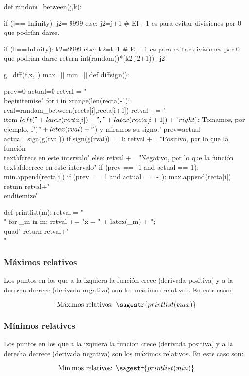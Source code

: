 \begin{sagesilent}

def random_between(j,k):
    
    if (j==-Infinity):
        j2=-9999
    else:
        j2=j+1 # El +1 es para evitar divisiones por 0 que podrían darse.
        
    if (k==Infinity):
        k2=9999
    else:        
        k2=k-1 # El +1 es para evitar divisiones por 0 que podrían darse
    return int(random()*(k2-j2+1))+j2

g=diff(f,x,1)
max=[]
min=[]
def diffsign():

    prev=0
    actual=0
    retval = "\\begin{itemize}"
    for i in xrange(len(recta)-1):
        rval=random_between(recta[i],recta[i+1])
        retval += "\\item $\\left("+latex(recta[i])+","+latex(recta[i+1])+"\\right)$: Tomamos, por ejemplo, f'($"+latex(rval)+"$) y miramos su signo:" 
        prev=actual
        actual=sign(g(rval))
        if sign(g(rval))==1: 
            retval += "Positivo, por lo que la función \\textbf{crece} en este intervalo"  
        else:
            retval += "Negativo, por lo que la función \\textbf{decrece} en este intervalo"
        if (prev == -1 and actual == 1):
            min.append(recta[i])
        if (prev == 1 and actual == -1):
            max.append(recta[i])
    return retval+"\\end{itemize}"

def printlist(m):
    retval = "\\{"
    for _m in m:
    	retval += "x = " + latex(_m) + ";\\quad"
    return retval+"\\}"

\end{sagesilent}


\subsubsection{Máximos relativos}
Los puntos en los que a la izquiera la función crece (derivada positiva) y a la derecha decrece (derivada negativa) son los máximos relativos. En este caso: 

\[\text{Máximos relativos: } \sagestr{printlist(max)}\]

\subsubsection{Mínimos relativos}
Los puntos en los que a la izquiera la función crece (derivada positiva) y a la derecha decrece (derivada negativa) son los máximos relativos. En este caso son: 

\[\text{Mínimos relativos: }\sagestr{printlist(min)}\]
